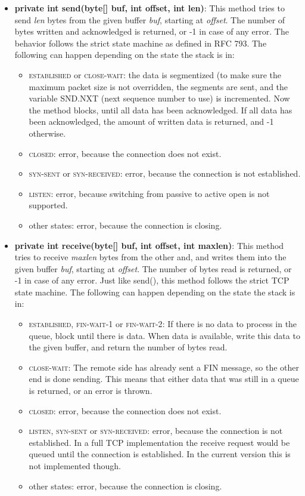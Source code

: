 \documentclass{hitec}
\newcommand{\state}[1]{\textsc{#1}}
\begin{document}
\begin{itemize}
 \item \textbf{private int send(byte[] buf, int offset, int len)}: This method tries to send \emph{len} bytes from the given buffer \emph{buf}, starting at \emph{offset}. The number of bytes written and acknowledged is returned, or -1 in case of any error. The behavior follows the strict state machine as defined in RFC 793. The following can happen depending on the state the stack is in: 
 
  \begin{itemize}
    \item \state{established} or \state{close-wait}: the data is segmentized (to make sure the maximum packet size is not overridden, the segments are sent, and the variable SND.NXT (next sequence number to use) is incremented. Now the method blocks, until all data has been acknowledged. If all data has been acknowledged, the amount of written data is returned, and -1 otherwise.
    \item \state{closed}: error, because the connection does not exist.
    \item \state{syn-sent} or \state{syn-received}: error, because the connection is not established.
    \item \state{listen}: error, because switching from passive to active open is not supported.
    \item other states: error, because the connection is closing.
  \end{itemize}
  
  \item \textbf{private int receive(byte[] buf, int offset, int maxlen)}: This method tries to receive \emph{maxlen} bytes from the other and, and writes them into the given buffer \emph{buf}, starting at \emph{offset}. The number of bytes read is returned, or -1 in case of any error. Just like send(), this method follows the strict TCP state machine. The following can happen depending on the state the stack is in:
  
  \begin{itemize}
    \item \state{established}, \state{fin-wait-1} or \state{fin-wait-2}: If there is no data to process in the queue, block until there is data. When data is available, write this data to the given buffer, and return the number of bytes read.
    \item \state{close-wait}: The remote side has already sent a FIN message, so the other end is done sending. This means that either data that was still in a queue is returned, or an error is thrown.
    \item \state{closed}: error, because the connection does not exist.
    \item \state{listen}, \state{syn-sent} or \state{syn-received}: error, because the connection is not established. In a full TCP implementation the receive request would be queued until the connection is established. In the current version this is not implemented though.
    \item other states: error, because the connection is closing.
  \end{itemize}
 

\end{itemize}
\end{document}
